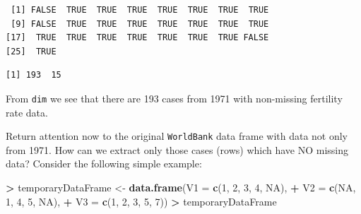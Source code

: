 \documentclass[
]{krantz}
\makeatletter
\newenvironment{Shaded}{\begin{snugshade}}{\end{snugshade}}
\newcommand{\DataTypeTok}[1]{\textcolor[rgb]{0.27,0.27,0.27}{#1}}
\newcommand{\DecValTok}[1]{\textcolor[rgb]{0.06,0.06,0.06}{#1}}
\newcommand{\KeywordTok}[1]{\textcolor[rgb]{0.27,0.27,0.27}{\textbf{#1}}}
\newcommand{\NormalTok}[1]{#1}
\newcommand{\OperatorTok}[1]{\textcolor[rgb]{0.43,0.43,0.43}{\textbf{#1}}}
\newcommand{\OtherTok}[1]{\textcolor[rgb]{0.37,0.37,0.37}{#1}}
\newcommand{\StringTok}[1]{\textcolor[rgb]{0.5,0.5,0.5}{#1}}
\newenvironment{kframe}{%
\medskip{}
\setlength{\fboxsep}{.8em}
 \def\at@end@of@kframe{}%
 \ifinner\ifhmode%
  \def\at@end@of@kframe{\end{minipage}}%
  \begin{minipage}{\columnwidth}%
 \fi\fi%
 \def\FrameCommand##1{\hskip\@totalleftmargin \hskip-\fboxsep
 \colorbox{shadecolor}{##1}\hskip-\fboxsep
     \hskip-\linewidth \hskip-\@totalleftmargin \hskip\columnwidth}%
 \MakeFramed {\advance\hsize-\width
   \@totalleftmargin\z@ \linewidth\hsize
   \@setminipage}}%
 {\par\unskip\endMakeFramed%
 \at@end@of@kframe}
\renewenvironment{Shaded}{\begin{kframe}}{\end{kframe}}
\makeatother
\begin{document}
\begin{verbatim}
 [1] FALSE  TRUE  TRUE  TRUE  TRUE  TRUE  TRUE  TRUE
 [9] FALSE  TRUE  TRUE  TRUE  TRUE  TRUE  TRUE  TRUE
[17]  TRUE  TRUE  TRUE  TRUE  TRUE  TRUE  TRUE FALSE
[25]  TRUE
\end{verbatim}

\begin{Shaded}
\end{Shaded}

\begin{verbatim}
[1] 193  15
\end{verbatim}

From \texttt{dim} we see that there are 193 cases from 1971 with non-missing fertility rate data.

Return attention now to the original \texttt{WorldBank} data frame with data not only from 1971. How can we extract only those cases (rows) which have NO missing data? Consider the following simple example:

\begin{Shaded}
\begin{Highlighting}[]
\OperatorTok{\textgreater{}}\StringTok{ }\NormalTok{temporaryDataFrame \textless{}{-}}\StringTok{ }\KeywordTok{data.frame}\NormalTok{(}\DataTypeTok{V1 =} \KeywordTok{c}\NormalTok{(}\DecValTok{1}\NormalTok{, }\DecValTok{2}\NormalTok{, }\DecValTok{3}\NormalTok{, }\DecValTok{4}\NormalTok{, }\OtherTok{NA}\NormalTok{),}
\OperatorTok{+}\StringTok{                                  }\DataTypeTok{V2 =} \KeywordTok{c}\NormalTok{(}\OtherTok{NA}\NormalTok{, }\DecValTok{1}\NormalTok{, }\DecValTok{4}\NormalTok{, }\DecValTok{5}\NormalTok{, }\OtherTok{NA}\NormalTok{),}
\OperatorTok{+}\StringTok{                                  }\DataTypeTok{V3 =} \KeywordTok{c}\NormalTok{(}\DecValTok{1}\NormalTok{, }\DecValTok{2}\NormalTok{, }\DecValTok{3}\NormalTok{, }\DecValTok{5}\NormalTok{, }\DecValTok{7}\NormalTok{))}
\OperatorTok{\textgreater{}}\StringTok{ }\NormalTok{temporaryDataFrame}
\end{Highlighting}
\end{Shaded}
\end{document}
